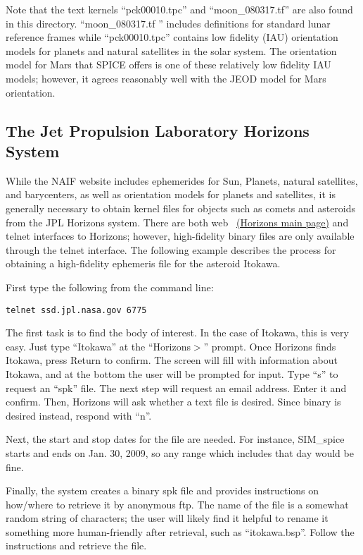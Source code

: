 Note that the text kernels
``pck00010.tpc'' and ``moon\_080317.tf'' are also found in this directory.
``moon\_080317.tf '' includes definitions for 
standard lunar reference frames while ``pck00010.tpc'' contains
low fidelity (IAU) orientation models for planets and natural satellites in the 
solar system. The orientation model for Mars that SPICE offers is one of these
relatively low fidelity IAU models; however, it agrees reasonably well with
the JEOD model for Mars orientation.


\subsection {The Jet Propulsion Laboratory Horizons System}
\label{subsec:horizons}
While the NAIF website includes ephemerides for Sun, Planets, natural
satellites, and barycenters, as well as orientation models for planets and
satellites, it is generally necessary to obtain kernel files for objects
such as comets and asteroids from the JPL Horizons system.  There are both
web ~\href{http://ssd.jpl.nasa.gov/?horizons}{(Horizons main page)} and telnet
interfaces to Horizons; however, high-fidelity binary files are only
available through the telnet interface.  The following example describes the
process for obtaining a high-fidelity ephemeris file for the asteroid Itokawa.

First type the following from the command line:
\begin{verbatim}
telnet ssd.jpl.nasa.gov 6775
\end{verbatim}
The first task is to find the body of interest. In the case of Itokawa, this
is very easy. Just type ``Itokawa'' at the ``Horizons$>$'' prompt. Once Horizons
finds Itokawa, press Return to confirm. The screen will fill with information
about Itokawa, and at the bottom the user will be prompted for input.  Type
``s'' to request an ``spk'' file.  The next step will request an email address.
Enter it and confirm.  Then, Horizons will ask whether a text file is desired.
Since binary is desired instead, respond with ``n''.

Next, the start and stop dates for the file are needed. For instance,
SIM\_spice starts and ends on Jan. 30, 2009, so any range which includes that
day would be fine.

Finally, the system creates a binary spk file and provides instructions on
how/where to retrieve it by anonymous ftp. The name of the file is a somewhat
random string of characters; the user will likely find it helpful to rename
it something more human-friendly after retrieval, such as ``itokawa.bsp''.
Follow the instructions and retrieve the file.


